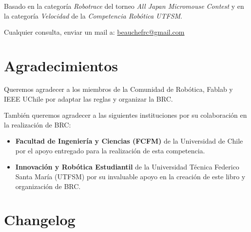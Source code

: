Basado en la categoría \emph{Robotrace} del torneo \emph{All Japan Micromouse Contest} y en la categoría \emph{Velocidad} de la \emph{Competencia Robótica UTFSM}.

Cualquier consulta, enviar un mail a: \href{mailto:beauchefrc@gmail.com}{beauchefrc@gmail.com}

\section*{Agradecimientos}

Queremos agradecer a los miembros de la Comunidad de Robótica, Fablab y IEEE UChile por adaptar las reglas y organizar la BRC.

También queremos agradecer a las siguientes instituciones por su colaboración en la realización de BRC:

\begin{itemize}
   \item \textbf{Facultad de Ingeniería y Ciencias (FCFM)} de la Universidad de Chile por el apoyo entregado para la realización de esta competencia. 
   \item  \textbf{Innovación y Robótica Estudiantil} de la Universidad Técnica Federico Santa María (UTFSM) por su invaluable apoyo en la creación de este libro y organización de BRC.
 \end{itemize} 


\section*{Changelog}

